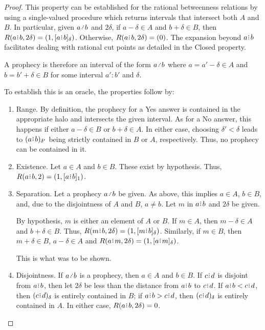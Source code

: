 \documentclass[12pt]{article}
\begin{document}
\begin{proof}
This property can be established for the rational betweenness relations by using a single-valued procedure which returns intervals that intersect both $A$ and $B$. In particular, given $a \lte b$ and $2\delta$, if $a-\delta \in A$ and $b+\delta \in B$, then $R(a\rint b, 2\delta) = (1, \clhalo[\delta]{a\rint b})$. Otherwise, $R(a \rint b, 2\delta) = (0)$.  The expansion beyond $a\rint b$ facilitates dealing with rational cut points as detailed in the Closed property. 

A prophecy is therefore an interval of the form $a\lte b$ where $a = a'-\delta \in A$ and $b=b'+\delta \in B$ for some interval $a':b'$ and $\delta$.

To establish this is an oracle, the properties follow by:  
\begin{enumerate}
    \item Range. By definition, the prophecy for a Yes answer is contained in the appropriate halo and intersects the given interval. As for a No answer, this happens if either $a - \delta \in B$ or $b+\delta \in A$. In either case, choosing $\delta' < \delta$ leads to $\halo[\delta']{a\rint b}$ being strictly contained in $B$ or $A$, respectively. Thus, no prophecy can be contained in it. 
    
    \item Existence. Let $a \in A$ and $b \in B$. These exist by hypothesis. Thus, $R(a\rint b, 2)= (1, \clhalo[1]{a\rint b})$.
    
    \item Separation. Let a prophecy $a \lte b$ be given. As above, this implies $a \in A$, $b \in B$, and, due to the disjointness of $A$ and $B$, $a \neq b$. Let $m$ in $a\rint b$ and $2\delta$ be given. 

    By hypothesis, $m$ is either an element of $A$ or $B$. If $m \in A$, then $m-\delta \in A$ and $b+\delta \in B$. Thus, $R(m\rint b, 2 \delta) = (1, \clhalo{m\rint b})$. Similarly, if $ m \in B$, then $m+\delta \in B$, $a-\delta \in A$ and $R(a\rint m, 2 \delta) = (1, \clhalo{a\rint m})$. 

    This is what was to be shown. 

    \item Disjointness. If $a\lte b$ is a prophecy, then $a \in A$ and $b \in B$. If $c\rint d$ is disjoint from $a\rint b$, then let $2\delta$ be less than the distance from $a\rint b$ to $c\rint d$. If $a\rint b < c\rint d$, then $\halo{c\rint d}$ is entirely contained in $B$; if $a\rint b > c\rint d$, then $\halo{c\rint d}$ is entirely contained in $A$. In either case, $R(a \rint b, 2 \delta) = 0$. 
    

\end{enumerate}
\end{proof}
\end{document}

